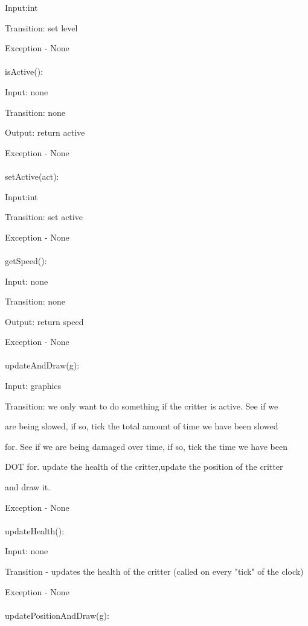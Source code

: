 \documentclass[12,english]{article}
\begin{document}
		    Input:int
		     
		    Transition: set level
		   
		     
		    Exception - None\\  
		    \\
		isActive():
		
		    Input: none
		     
		    Transition: none
		    
		    Output: return active
		     
		    Exception - None\\  
		    \\
		    
		setActive(act):
		
		    Input:int
		     
		    Transition: set active
		   
		     
		    Exception - None\\  
		    \\  
		getSpeed():
		
		    Input: none
		     
		    Transition: none
		    
		    Output: return speed
		     
		    Exception - None\\  
		    \\
		updateAndDraw(g):
		
		    Input: graphics
		     
		    Transition: we only want to do something if the critter is active. See if we 
		    
		    are being slowed, if so, tick the total amount of time we have been slowed 
		    
		    for. See if we are being damaged over time, if so, tick the time we have been
		    
		    DOT for. update the health of the critter,update the position of the critter 
		    
		    and draw it.
		   
		     
		    Exception - None\\  
		    \\  
		   
		updateHealth():
		    
		    Input: none
		       
		    Transition - updates the health of the critter (called on every "tick" of the clock)
		    
		    Exception - None\\ 
			 \\
		updatePositionAndDraw(g):
		    
\end{document}

